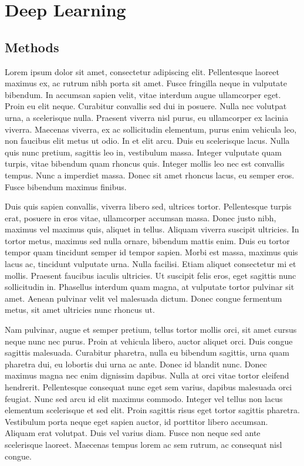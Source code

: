 \chapter{Deep Learning}
\section{Methods}

Lorem ipsum dolor sit amet, consectetur adipiscing elit. Pellentesque laoreet maximus ex, ac rutrum nibh porta sit amet. Fusce fringilla neque in vulputate bibendum. In accumsan sapien velit, vitae interdum augue ullamcorper eget. Proin eu elit neque. Curabitur convallis sed dui in posuere. Nulla nec volutpat urna, a scelerisque nulla. Praesent viverra nisl purus, eu ullamcorper ex lacinia viverra. Maecenas viverra, ex ac sollicitudin elementum, purus enim vehicula leo, non faucibus elit metus ut odio. In et elit arcu. Duis eu scelerisque lacus. Nulla quis nunc pretium, sagittis leo in, vestibulum massa. Integer vulputate quam turpis, vitae bibendum quam rhoncus quis. Integer mollis leo nec est convallis tempus. Nunc a imperdiet massa. Donec sit amet rhoncus lacus, eu semper eros. Fusce bibendum maximus finibus.

Duis quis sapien convallis, viverra libero sed, ultrices tortor. Pellentesque turpis erat, posuere in eros vitae, ullamcorper accumsan massa. Donec justo nibh, maximus vel maximus quis, aliquet in tellus. Aliquam viverra suscipit ultricies. In tortor metus, maximus sed nulla ornare, bibendum mattis enim. Duis eu tortor tempor quam tincidunt semper id tempor sapien. Morbi est massa, maximus quis lacus ac, tincidunt vulputate urna. Nulla facilisi. Etiam aliquet consectetur mi et mollis. Praesent faucibus iaculis ultricies. Ut suscipit felis eros, eget sagittis nunc sollicitudin in. Phasellus interdum quam magna, at vulputate tortor pulvinar sit amet. Aenean pulvinar velit vel malesuada dictum. Donec congue fermentum metus, sit amet ultricies nunc rhoncus ut.

Nam pulvinar, augue et semper pretium, tellus tortor mollis orci, sit amet cursus neque nunc nec purus. Proin at vehicula libero, auctor aliquet orci. Duis congue sagittis malesuada. Curabitur pharetra, nulla eu bibendum sagittis, urna quam pharetra dui, eu lobortis dui urna ac ante. Donec id blandit nunc. Donec maximus magna nec enim dignissim dapibus. Nulla at orci vitae tortor eleifend hendrerit. Pellentesque consequat nunc eget sem varius, dapibus malesuada orci feugiat. Nunc sed arcu id elit maximus commodo. Integer vel tellus non lacus elementum scelerisque et sed elit. Proin sagittis risus eget tortor sagittis pharetra. Vestibulum porta neque eget sapien auctor, id porttitor libero accumsan. Aliquam erat volutpat. Duis vel varius diam. Fusce non neque sed ante scelerisque laoreet. Maecenas tempus lorem ac sem rutrum, ac consequat nisl congue.

